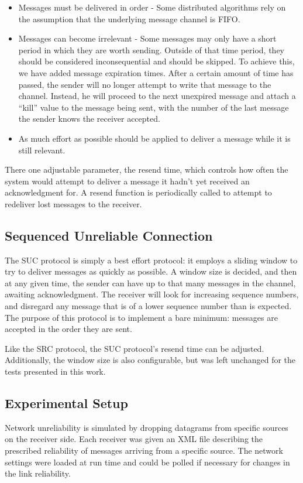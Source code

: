 \begin{itemize}
\item Messages must be delivered in order - Some distributed algorithms rely on
the assumption that the underlying message channel is FIFO.
\item Messages can become irrelevant - Some messages may only have a short
period in which they are worth sending. Outside of that time period, they
should be considered inconsequential and should be skipped. To achieve this, we
have added message expiration times. After a certain amount of time has passed,
the sender will no longer attempt to write that message to the channel.
Instead, he will proceed to the next unexpired message and attach a ``kill''
value to the message being sent, with the number of the last message the sender
knows the receiver accepted.
\item As much effort as possible should be applied to deliver a message while
it is still relevant.
\end{itemize}

There one adjustable parameter, the resend time, which controls how often the
system would attempt to deliver a message it hadn't yet received an
acknowledgment for. A resend function is periodically called to attempt to redeliver
lost messages to the receiver.

\subsection{Sequenced Unreliable Connection}
The SUC protocol is simply a best effort protocol: it employs a sliding window 
to try to deliver messages as quickly as possible. A window size is decided, 
and then at any given time, the sender can have up to that many messages in the 
channel, awaiting acknowledgment. The receiver will look for increasing 
sequence numbers, and disregard any message that is of a lower sequence number 
than is expected. The purpose of this protocol is to implement a bare minimum: 
messages are accepted in the order they are sent.

Like the SRC protocol, the SUC protocol's resend time can be adjusted. 
Additionally, the window size is also configurable, but was left unchanged for 
the tests presented in this work.

\subsection{Experimental Setup}
Network unreliability is simulated by dropping datagrams from specific sources
on the receiver side. Each receiver was given an XML file describing the
prescribed reliability of messages arriving from a specific source. The
network settings were loaded at run time and could be polled if necessary for
changes in the link reliability.

